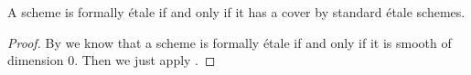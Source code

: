 \begin{corollary}
A scheme is formally étale if and only if it has a cover by standard étale schemes.
\end{corollary}

\begin{proof}
By  we know that a scheme is formally étale if and only if it is smooth of dimension $0$. Then we just apply .
\end{proof}

